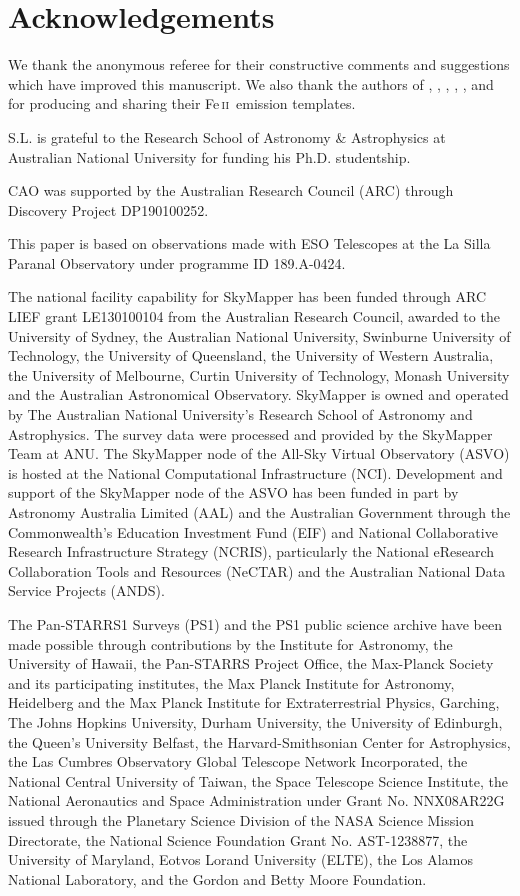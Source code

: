 \documentclass[fleqn,usenatbib]{mnras}
\newcommand{\feii}{Fe\,\textsc{ii}}
\begin{document}
\section*{Acknowledgements}
We thank the anonymous referee for their constructive comments and suggestions which have improved this manuscript. We also thank the authors of \citet{Vestergaard_2001}, \citet{Tsuzuki_2006}, \citet{Bruhweiler_Verner_2008}, \citet{Mejia-Restrepo_2016}, \citet{Boroson_Greene_1992}, and \citet{Park_2022} for producing and sharing their \feii\ emission templates.

S.L. is grateful to the Research School of Astronomy \& Astrophysics at Australian National University for funding his Ph.D. studentship.

CAO was supported by the Australian Research Council (ARC) through Discovery Project DP190100252.

This paper is based on observations made with ESO Telescopes at the La Silla Paranal Observatory under programme ID 189.A-0424. 

The national facility capability for SkyMapper has been funded through ARC LIEF grant LE130100104 from the Australian Research Council, awarded to the University of Sydney, the Australian National University, Swinburne University of Technology, the University of Queensland, the University of Western Australia, the University of Melbourne, Curtin University of Technology, Monash University and the Australian Astronomical Observatory. SkyMapper is owned and operated by The Australian National University's Research School of Astronomy and Astrophysics. The survey data were processed and provided by the SkyMapper Team at ANU. The SkyMapper node of the All-Sky Virtual Observatory (ASVO) is hosted at the National Computational Infrastructure (NCI). Development and support of the SkyMapper node of the ASVO has been funded in part by Astronomy Australia Limited (AAL) and the Australian Government through the Commonwealth's Education Investment Fund (EIF) and National Collaborative Research Infrastructure Strategy (NCRIS), particularly the National eResearch Collaboration Tools and Resources (NeCTAR) and the Australian National Data Service Projects (ANDS).

The Pan-STARRS1 Surveys (PS1) and the PS1 public science archive have been made possible through contributions by the Institute for Astronomy, the University of Hawaii, the Pan-STARRS Project Office, the Max-Planck Society and its participating institutes, the Max Planck Institute for Astronomy, Heidelberg and the Max Planck Institute for Extraterrestrial Physics, Garching, The Johns Hopkins University, Durham University, the University of Edinburgh, the Queen's University Belfast, the Harvard-Smithsonian Center for Astrophysics, the Las Cumbres Observatory Global Telescope Network Incorporated, the National Central University of Taiwan, the Space Telescope Science Institute, the National Aeronautics and Space Administration under Grant No. NNX08AR22G issued through the Planetary Science Division of the NASA Science Mission Directorate, the National Science Foundation Grant No. AST-1238877, the University of Maryland, Eotvos Lorand University (ELTE), the Los Alamos National Laboratory, and the Gordon and Betty Moore Foundation.
\end{document}
